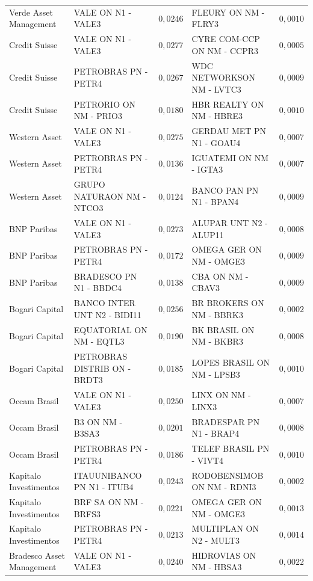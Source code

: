 \documentclass[11pt,a4paper]{article}
\begin{document}
\begin{center}
\begin{longtable}{@{}lp{3.9cm}rp{3.9cm}r@{}}
Verde Asset Management & VALE ON N1 - VALE3 & $0{,}0246$ & FLEURY ON NM - FLRY3 & $0{,}0010$ \\
Credit Suisse & VALE ON N1 - VALE3 & $0{,}0277$ & CYRE COM-CCP ON NM - CCPR3 & $0{,}0005$ \\
Credit Suisse & PETROBRAS PN - PETR4 & $0{,}0267$ & WDC NETWORKSON NM - LVTC3 & $0{,}0009$ \\
Credit Suisse & PETRORIO ON NM - PRIO3 & $0{,}0180$ & HBR REALTY ON NM - HBRE3 & $0{,}0010$ \\
Western Asset & VALE ON N1 - VALE3 & $0{,}0275$ & GERDAU MET PN N1 - GOAU4 & $0{,}0007$ \\
Western Asset & PETROBRAS PN - PETR4 & $0{,}0136$ & IGUATEMI ON NM - IGTA3 & $0{,}0007$ \\
Western Asset & GRUPO NATURAON NM - NTCO3 & $0{,}0124$ & BANCO PAN PN N1 - BPAN4 & $0{,}0009$ \\
BNP Paribas & VALE ON N1 - VALE3 & $0{,}0273$ & ALUPAR UNT N2 - ALUP11 & $0{,}0008$ \\
BNP Paribas & PETROBRAS PN - PETR4 & $0{,}0172$ & OMEGA GER ON NM - OMGE3 & $0{,}0009$ \\
BNP Paribas & BRADESCO PN N1 - BBDC4 & $0{,}0138$ & CBA ON NM - CBAV3 & $0{,}0009$ \\
Bogari Capital & BANCO INTER UNT N2 - BIDI11 & $0{,}0256$ & BR BROKERS ON NM - BBRK3 & $0{,}0002$ \\
Bogari Capital & EQUATORIAL ON NM - EQTL3 & $0{,}0190$ & BK BRASIL ON NM - BKBR3 & $0{,}0008$ \\
Bogari Capital & PETROBRAS DISTRIB ON - BRDT3 & $0{,}0185$ & LOPES BRASIL ON NM - LPSB3 & $0{,}0010$ \\
Occam Brasil & VALE ON N1 - VALE3 & $0{,}0250$ & LINX ON NM - LINX3 & $0{,}0007$ \\
Occam Brasil & B3 ON NM - B3SA3 & $0{,}0201$ & BRADESPAR PN N1 - BRAP4 & $0{,}0008$ \\
Occam Brasil & PETROBRAS PN - PETR4 & $0{,}0186$ & TELEF BRASIL PN - VIVT4 & $0{,}0010$ \\
Kapitalo Investimentos & ITAUUNIBANCO PN N1 - ITUB4 & $0{,}0243$ & RODOBENSIMOB ON NM - RDNI3 & $0{,}0002$ \\
Kapitalo Investimentos & BRF SA ON NM - BRFS3 & $0{,}0221$ & OMEGA GER ON NM - OMGE3 & $0{,}0013$ \\
Kapitalo Investimentos & PETROBRAS PN - PETR4 & $0{,}0213$ & MULTIPLAN ON N2 - MULT3 & $0{,}0014$ \\
Bradesco Asset Management & VALE ON N1 - VALE3 & $0{,}0240$ & HIDROVIAS ON NM - HBSA3 & $0{,}0022$ \\

\end{longtable}
\end{center}
\end{document}

